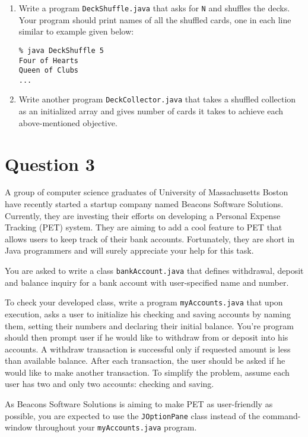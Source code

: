 \begin{enumerate}
\item Write a program \texttt{DeckShuffle.java} that asks for \texttt{N} and shuffles the decks. Your program should print names of all the shuffled cards, one in each line similar to example given below:
\begin{verbatim}
% java DeckShuffle 5
Four of Hearts
Queen of Clubs
...
\end{verbatim}
\item Write another program \texttt{DeckCollector.java} that takes a shuffled collection as an initialized array and gives number of cards it takes to achieve each above-mentioned objective.
\end{enumerate}

\section*{Question 3}
A group of computer science graduates of University of Massachusetts Boston have recently started a startup company named Beacons Software Solutions.
Currently, they are investing their efforts on developing a Personal Expense Tracking (PET) system.
They are aiming to add a cool feature to PET that allows users to keep track of their bank accounts.
Fortunately, they are short in Java programmers and will surely appreciate your help for this task.

You are asked to write a class \texttt{bankAccount.java} that defines withdrawal, deposit and balance inquiry for a bank account with user-specified name and number.

To check your developed class, write a program \texttt{myAccounts.java} that upon execution, asks a user to initialize his checking and saving accounts by naming them, setting their numbers and declaring their initial balance.
You're program should then prompt user if he would like to withdraw from or deposit into his accounts.
A withdraw transaction is successful only if requested amount is less than available balance.
After each transaction, the user should be asked if he would like to make another transaction.
To simplify the problem, assume each user has two and only two accounts: checking and saving.

As Beacons Software Solutions is aiming to make PET as user-friendly as possible, you are expected to use the \texttt{JOptionPane} class instead of the command-window throughout your \texttt{myAccounts.java} program.
